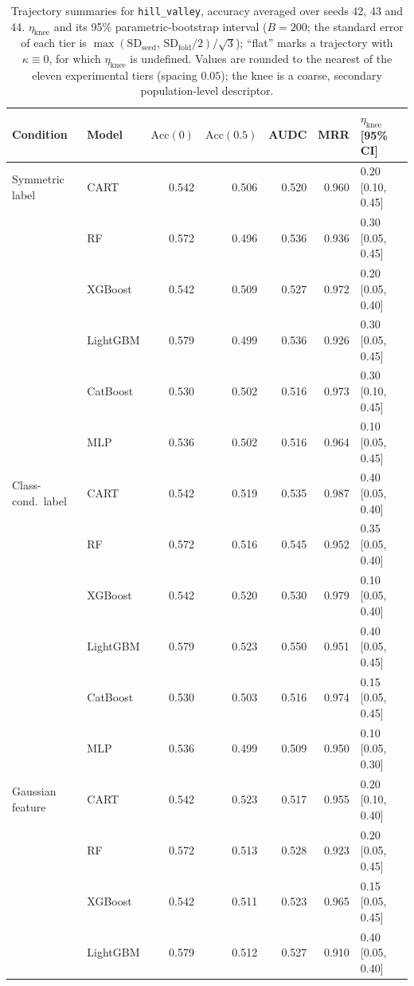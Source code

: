 \documentclass[pdflatex,sn-mathphys]{sn-jnl}
\theoremstyle{thmstyleone}
\begin{document}
\begin{table}[htbp]
\centering
\scriptsize
\setlength{\tabcolsep}{3.5pt}
\caption{Trajectory summaries for \texttt{hill\_valley}, accuracy averaged over seeds 42, 43 and 44. $\eta_{\mathrm{knee}}$ and its 95\% parametric-bootstrap interval ($B=200$; the standard error of each tier is $\max(\mathrm{SD}_{\mathrm{seed}},\,\mathrm{SD}_{\mathrm{fold}}/2)/\sqrt3$); ``flat'' marks a trajectory with $\kappa\equiv 0$, for which $\eta_{\mathrm{knee}}$ is undefined. Values are rounded to the nearest of the eleven experimental tiers (spacing $0.05$); the knee is a coarse, secondary population-level descriptor.}
\label{tab:traj_hill_valley}
\begin{tabular}{@{}llrrrrl@{}}
\toprule
Condition & Model & $\mathrm{Acc}(0)$ & $\mathrm{Acc}(0.5)$ & AUDC & MRR & $\eta_{\mathrm{knee}}$ [95\% CI] \\
\midrule
Symmetric label & CART & 0.542 & 0.506 & 0.520 & 0.960 & 0.20 [0.10, 0.45] \\
 & RF & 0.572 & 0.496 & 0.536 & 0.936 & 0.30 [0.05, 0.45] \\
 & XGBoost & 0.542 & 0.509 & 0.527 & 0.972 & 0.20 [0.05, 0.40] \\
 & LightGBM & 0.579 & 0.499 & 0.536 & 0.926 & 0.30 [0.05, 0.45] \\
 & CatBoost & 0.530 & 0.502 & 0.516 & 0.973 & 0.30 [0.10, 0.45] \\
 & MLP & 0.536 & 0.502 & 0.516 & 0.964 & 0.10 [0.05, 0.45] \\
\midrule
Class-cond.\ label & CART & 0.542 & 0.519 & 0.535 & 0.987 & 0.40 [0.05, 0.40] \\
 & RF & 0.572 & 0.516 & 0.545 & 0.952 & 0.35 [0.05, 0.40] \\
 & XGBoost & 0.542 & 0.520 & 0.530 & 0.979 & 0.10 [0.05, 0.40] \\
 & LightGBM & 0.579 & 0.523 & 0.550 & 0.951 & 0.40 [0.05, 0.45] \\
 & CatBoost & 0.530 & 0.503 & 0.516 & 0.974 & 0.15 [0.05, 0.45] \\
 & MLP & 0.536 & 0.499 & 0.509 & 0.950 & 0.10 [0.05, 0.30] \\
\midrule
Gaussian feature & CART & 0.542 & 0.523 & 0.517 & 0.955 & 0.20 [0.10, 0.40] \\
 & RF & 0.572 & 0.513 & 0.528 & 0.923 & 0.20 [0.05, 0.45] \\
 & XGBoost & 0.542 & 0.511 & 0.523 & 0.965 & 0.15 [0.05, 0.45] \\
 & LightGBM & 0.579 & 0.512 & 0.527 & 0.910 & 0.40 [0.05, 0.40] \\

\end{tabular}
\end{table}
\end{document}
